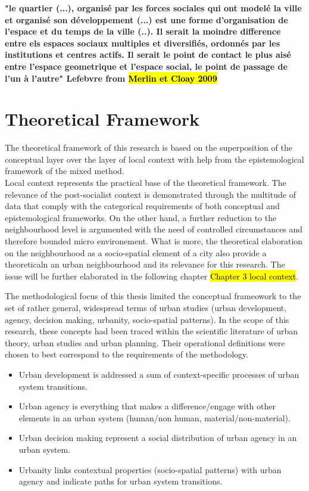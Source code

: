 \documentclass[11pt]{report}
\begin{document}
\textbf{"le quartier (...), organisé par les forces sociales qui ont modelé la ville et organisé son développement (...) est une forme d'organisation de l'espace et du temps de la ville (..). Il serait la moindre difference entre els espaces sociaux multiples et diversifiés, ordonnés par les institutions et centres actifs. Il serait le point de contact le plus aisé entre l'espace geometrique et l'espace social, le point de passage de l'un à l'autre" Lefebvre from \hl{Merlin et Cloay 2009}}

\section{Theoretical Framework}

The theoretical framework of this research is based on the superposition of the conceptual layer over the layer of local context with help from the epistemological framework of the mixed method.
\\
Local context represents the practical base of the theoretical framework.
The relevance of the post-socialist context is demonstrated through the multitude of data that comply with the categorical requirements of both conceptual and epistemological frameworks.
On the other hand, a further reduction to the neighbourhood level is argumented with the need of 
controlled circumstances and therefore bounded micro environement. What is more, the theoretical elaboration on the neighbourhood as a socio-spatial element of a city also provide a theoreticaln an urban neighbourhood and its relevance for this research. The issue will be further elaborated in the following chapter \hl{Chapter 3 local context}.

The methodological focus of this thesis limited the conceptual frameowork to the set of rather general, widespread terms of urban studies (urban development, agency, decision making, urbanity, socio-spatial patterns).
In the scope of this research, these concepts had been traced within the scientific literature of urban theory, urban studies and urban planning. Their operational definitions were chosen to best correspond to the requirements of the methodology.

\begin{itemize}
\item Urban development is addressed a sum of context-specific processes of urban system transitions.
\item Urban agency is everything that makes a difference/engage with other elements in an urban system (human/non human, material/non-material).
\item Urban decision making represent a social distribution of urban agency in an urban system.
\item Urbanity links contextual properties (socio-spatial patterns) with urban agency and indicate paths for urban system transitions.
\end{itemize}
\end{document}
